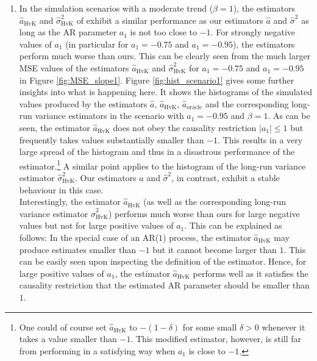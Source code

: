 \begin{enumerate}[label=(\roman*),leftmargin=0.9cm]


\item In the simulation scenarios with a moderate trend ($\beta = 1$), the estimators $\widehat{a}_{\text{HvK}}$ and $\widehat{\sigma}^2_{\text{HvK}}$ of \cite{Hall2003} exhibit a similar performance as our estimators $\widehat{a}$ and $\widehat{\sigma}^2$ as long as the AR parameter $a_1$ is not too close to $-1$. For strongly negative values of $a_1$ (in particular for $a_1 = -0.75$ and $a_1 = -0.95$), the estimators perform much worse than ours. This can be clearly seen from the much larger MSE values of the estimators  $\widehat{a}_{\text{HvK}}$ and $\widehat{\sigma}^2_{\text{HvK}}$ for $a_1 = -0.75$ and $a_1 = -0.95$ in Figure \ref{fig:MSE_slope1}. Figure \ref{fig:hist_scenario1} gives some further insights into what is happening here. It shows the histograms of the simulated values produced by the estimators $\widehat{a}$, $\widehat{a}_{\text{HvK}}$, $\widehat{a}_{\text{oracle}}$ and the corresponding long-run variance estimators in the scenario with $a_1=-0.95$ and $\beta = 1$. As can be seen, the estimator $\widehat{a}_{\text{HvK}}$ does not obey the causality restriction $|a_1| \le 1$ but frequently takes values substantially smaller than $-1$. This results in a very large spread of the histogram and thus in a disastrous performance of the estimator.\footnote{One could of course set $\widehat{a}_{\text{HvK}}$ to $-(1 - \delta)$ for some small $\delta > 0$ whenever it takes a value smaller than $-1$. This modified estimator, however, is still far from performing in a satisfying way when $a_1$ is close to $-1$.} A similar point applies to the histogram of the long-run variance estimator $\widehat{\sigma}^2_{\text{HvK}}$. Our estimators $\widehat{a}$ and $\widehat{\sigma}^2$, in contrast, exhibit a stable behaviour in this case. \\ %
Interestingly, the estimator $\widehat{a}_{\text{HvK}}$ (as well as the corresponding long-run variance estimator $\widehat{\sigma}^2_{\text{HvK}}$) performs much worse than ours for large negative values but not for large positive values of $a_1$. This can be explained as follows: In the special case of an AR($1$) process, the estimator $\widehat{a}_{\text{HvK}}$ may produce estimates smaller than $-1$ but it cannot become larger than $1$. This can be easily seen upon inspecting the definition of the estimator. Hence, for large positive values of $a_1$, the estimator $\widehat{a}_{\text{HvK}}$ performs well as it satisfies the causality restriction that the estimated AR parameter should be smaller than $1$. 


\end{enumerate}
